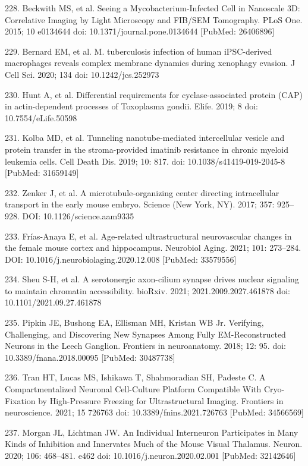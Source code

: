 \documentclass{article}
\begin{document}
\begin{hangpars}
228. Beckwith MS, et al. Seeing a Mycobacterium-Infected Cell in Nanoscale 3D: Correlative Imaging by Light Microscopy and FIB/SEM Tomography. PLoS One. 2015; 10 e0134644 doi: 10.1371/journal.pone.0134644 [PubMed: 26406896]

229. Bernard EM, et al. M. tuberculosis infection of human iPSC-derived macrophages reveals complex membrane dynamics during xenophagy evasion. J Cell Sci. 2020; 134 doi: 10.1242/jcs.252973

230. Hunt A, et al. Differential requirements for cyclase-associated protein (CAP) in actin-dependent processes of Toxoplasma gondii. Elife. 2019; 8 doi: 10.7554/eLife.50598

231. Kolba MD, et al. Tunneling nanotube-mediated intercellular vesicle and protein transfer in the stroma-provided imatinib resistance in chronic myeloid leukemia cells. Cell Death Dis. 2019; 10: 817. doi: 10.1038/s41419-019-2045-8 [PubMed: 31659149]

232. Zenker J, et al. A microtubule-organizing center directing intracellular transport in the early mouse embryo. Science (New York, NY). 2017; 357: 925–928. DOI: 10.1126/science.aam9335

233. Frías-Anaya E, et al. Age-related ultrastructural neurovascular changes in the female mouse cortex and hippocampus. Neurobiol Aging. 2021; 101: 273–284. DOI: 10.1016/j.neurobiolaging.2020.12.008 [PubMed: 33579556]

234. Sheu S-H, et al. A serotonergic axon-cilium synapse drives nuclear signaling to maintain chromatin accessibility. bioRxiv. 2021; 2021.2009.2027.461878 doi: 10.1101/2021.09.27.461878

235. Pipkin JE, Bushong EA, Ellisman MH, Kristan WB Jr. Verifying, Challenging, and Discovering New Synapses Among Fully EM-Reconstructed Neurons in the Leech Ganglion. Frontiers in neuroanatomy. 2018; 12: 95. doi: 10.3389/fnana.2018.00095 [PubMed: 30487738]

236. Tran HT, Lucas MS, Ishikawa T, Shahmoradian SH, Padeste C. A Compartmentalized Neuronal Cell-Culture Platform Compatible With Cryo-Fixation by High-Pressure Freezing for Ultrastructural Imaging. Frontiers in neuroscience. 2021; 15 726763 doi: 10.3389/fnins.2021.726763 [PubMed: 34566569]

237. Morgan JL, Lichtman JW. An Individual Interneuron Participates in Many Kinds of Inhibition and Innervates Much of the Mouse Visual Thalamus. Neuron. 2020; 106: 468–481. e462 doi: 10.1016/j.neuron.2020.02.001 [PubMed: 32142646]


\end{hangpars}
\end{document}
